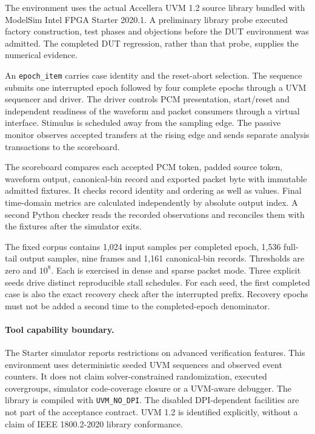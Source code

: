 The environment uses the actual Accellera UVM 1.2 source library bundled with ModelSim Intel FPGA Starter 2020.1. A preliminary library probe executed factory construction, test phases and objections before the DUT environment was admitted. The completed DUT regression, rather than that probe, supplies the numerical evidence.

An \texttt{epoch\_item} carries case identity and the reset-abort selection. The sequence submits one interrupted epoch followed by four complete epochs through a UVM sequencer and driver. The driver controls PCM presentation, start/reset and independent readiness of the waveform and packet consumers through a virtual interface. Stimulus is scheduled away from the sampling edge. The passive monitor observes accepted transfers at the rising edge and sends separate analysis transactions to the scoreboard.

The scoreboard compares each accepted PCM token, padded source token, waveform output, canonical-bin record and exported packet byte with immutable admitted fixtures. It checks record identity and ordering as well as values. Final time-domain metrics are calculated independently by absolute output index. A second Python checker reads the recorded observations and reconciles them with the fixtures after the simulator exits.

The fixed corpus contains 1,024 input samples per completed epoch, 1,536 full-tail output samples, nine frames and 1,161 canonical-bin records. Thresholds are zero and $10^8$. Each is exercised in dense and sparse packet mode. Three explicit seeds drive distinct reproducible stall schedules. For each seed, the first completed case is also the exact recovery check after the interrupted prefix. Recovery epochs must not be added a second time to the completed-epoch denominator.

\paragraph{Tool capability boundary.}
The Starter simulator reports restrictions on advanced verification features. This environment uses deterministic seeded UVM sequences and observed event counters. It does not claim solver-constrained randomization, executed covergroups, simulator code-coverage closure or a UVM-aware debugger. The library is compiled with \texttt{UVM\_NO\_DPI}. The disabled DPI-dependent facilities are not part of the acceptance contract. UVM 1.2 is identified explicitly, without a claim of IEEE 1800.2-2020 library conformance.
